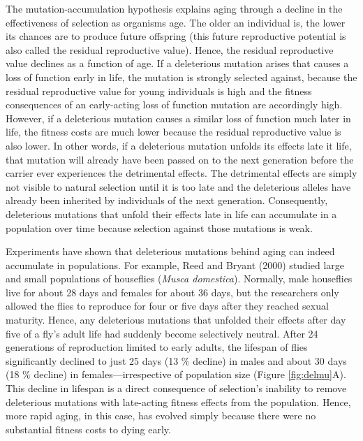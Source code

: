 \documentclass[
]{book}
\begin{document}
The mutation-accumulation hypothesis explains aging through a decline in the effectiveness of selection as organisms age. The older an individual is, the lower its chances are to produce future offspring (this future reproductive potential is also called the residual reproductive value). Hence, the residual reproductive value declines as a function of age. If a deleterious mutation arises that causes a loss of function early in life, the mutation is strongly selected against, because the residual reproductive value for young individuals is high and the fitness consequences of an early-acting loss of function mutation are accordingly high. However, if a deleterious mutation causes a similar loss of function much later in life, the fitness costs are much lower because the residual reproductive value is also lower. In other words, if a deleterious mutation unfolds its effects late it life, that mutation will already have been passed on to the next generation before the carrier ever experiences the detrimental effects. The detrimental effects are simply not visible to natural selection until it is too late and the deleterious alleles have already been inherited by individuals of the next generation. Consequently, deleterious mutations that unfold their effects late in life can accumulate in a population over time because selection against those mutations is weak.

Experiments have shown that deleterious mutations behind aging can indeed accumulate in populations. For example, Reed and Bryant (2000) studied large and small populations of houseflies (\emph{Musca domestica}). Normally, male houseflies live for about 28 days and females for about 36 days, but the researchers only allowed the flies to reproduce for four or five days after they reached sexual maturity. Hence, any deleterious mutations that unfolded their effects after day five of a fly's adult life had suddenly become selectively neutral. After 24 generations of reproduction limited to early adults, the lifespan of flies significantly declined to just 25 days (13 \% decline) in males and about 30 days (18 \% decline) in females---irrespective of population size (Figure \ref{fig:delmu}A). This decline in lifespan is a direct consequence of selection's inability to remove deleterious mutations with late-acting fitness effects from the population. Hence, more rapid aging, in this case, has evolved simply because there were no substantial fitness costs to dying early.
\end{document}
